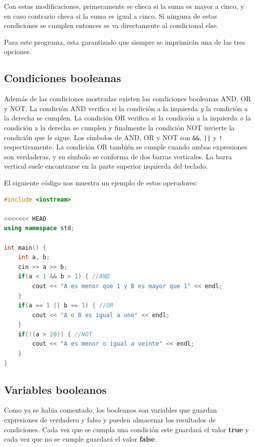 \documentclass{article}
\begin{document}
Con estas modificaciones, primeramente se checa si la suma es mayor a cinco, y en caso contrario checa si la suma es igual a cinco. Si ninguna de estas condiciones se cumplen entonces se va directamente al condicional else.

Para este programa, esta garantizado que siempre se imprimirán una de las tres opciones.

\subsection{Condiciones booleanas}

Además de las condiciones mostradas existen las condiciones booleanas AND, OR y NOT. La condición AND verifica si la condición a la izquierda \textit{y} la condición a la derecha se cumplen. La condición OR verifica si la condición a la izquierda \textit{o} la condición a la derecha se cumplen y finalmente la condición NOT invierte la condición que le sigue. Los símbolos de AND, OR y NOT son \lstinline{&&}, \lstinline{||} y \lstinline{!} respectivamente. La condición OR también se cumple cuando ambas expresiones son verdaderas, y su símbolo se conforma de dos barras verticales. La barra vertical suele encontrarse en la parte superior izquierda del teclado.

El siguiente código nos muestra un ejemplo de estos operadores:

\begin{lstlisting}[language=C++, title=Lógica booleana]
#include <iostream>

<<<<<<< HEAD
using namespace std;

int main() {
	int a, b;
	cin >> a >> b;
	if(a < 1 && b > 1) { //AND
		cout << "A es menor que 1 y B es mayor que 1" << endl;
	}
	if(a == 1 || b == 1) { //OR
		cout << "A o B es igual a uno" << endl;
	}
	if(!(a > 20)) { //NOT
		cout << "A es menor o igual a veinte" << endl;
	}
}
\end{lstlisting}

\subsection{Variables booleanos}

Como ya se habia comentado, los booleanos son variables que guardan expresiones de verdadero y falso y pueden almacenar los resultados de condiciones. Cada vez que se cumpla una condición este guardará el valor \textbf{true} y cada vez que no se cumple guardará el valor \textbf{false}.
\end{document}
